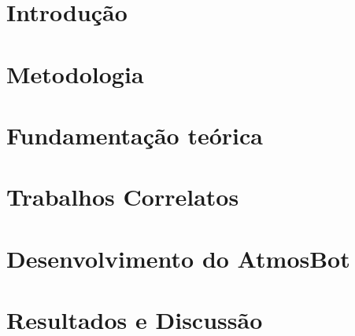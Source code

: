 \documentclass[tcc,baec,oneside]{unipampa}
\begin{document}
\tableofcontents

% 
%


\chapter{Introdução}
\label{cap-introducao}


\chapter{Metodologia}
\label{cap-metodologia}


\chapter{Fundamentação teórica}
\label{cap-revisao-bibliografica}


\chapter{Trabalhos Correlatos}
\label{cap-trabalhos-relacionados}


\chapter{Desenvolvimento do AtmosBot}
\label{cap-desenvolvimento}


\chapter{Resultados e Discussão}
\label{cap-resultadosdiscussao}

\end{document}
